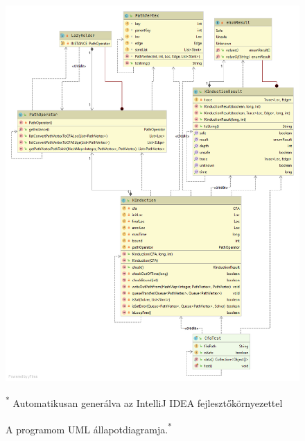 \begin{figure}[!ht]
	\centering
	\includegraphics[width=150mm, keepaspectratio]{figures/allapot_diagram.png}
	\caption[Caption for LOF]{A programom UML állapotdiagramja.\textsuperscript{*}}
	\small\textsuperscript{*} Automatikusan generálva az IntelliJ IDEA fejlesztőkörnyezettel
	\label{fig:state_diagram}
\end{figure}
\clearpage

